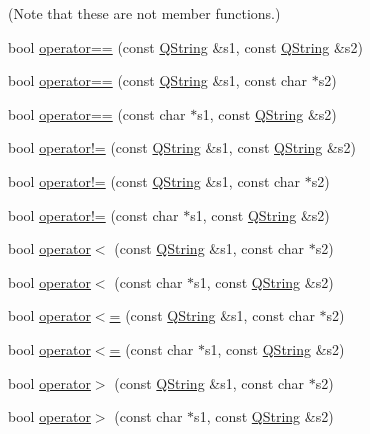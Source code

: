 (Note that these are not member functions.) \begin{DoxyCompactItemize}
\item 
bool \mbox{\hyperlink{class_q_string_acdeb7d77a324fe69b0e5889ff8575400}{operator==}} (const \mbox{\hyperlink{class_q_string}{Q\+String}} \&s1, const \mbox{\hyperlink{class_q_string}{Q\+String}} \&s2)
\item 
bool \mbox{\hyperlink{class_q_string_af35a5ca71a731a8ecf66c62a74123be2}{operator==}} (const \mbox{\hyperlink{class_q_string}{Q\+String}} \&s1, const char $\ast$s2)
\item 
bool \mbox{\hyperlink{class_q_string_af13dfeb5517343bb511393c74f18a3b6}{operator==}} (const char $\ast$s1, const \mbox{\hyperlink{class_q_string}{Q\+String}} \&s2)
\item 
bool \mbox{\hyperlink{class_q_string_aaeae05f02ef07005a07ac285706920dd}{operator!=}} (const \mbox{\hyperlink{class_q_string}{Q\+String}} \&s1, const \mbox{\hyperlink{class_q_string}{Q\+String}} \&s2)
\item 
bool \mbox{\hyperlink{class_q_string_a77e694c60b1699442a3f13e8bbc0c4a9}{operator!=}} (const \mbox{\hyperlink{class_q_string}{Q\+String}} \&s1, const char $\ast$s2)
\item 
bool \mbox{\hyperlink{class_q_string_aba83e5b91872eeb6af5f55d7b96ab50b}{operator!=}} (const char $\ast$s1, const \mbox{\hyperlink{class_q_string}{Q\+String}} \&s2)
\item 
bool \mbox{\hyperlink{class_q_string_abe479c7e9bb723be856c1bcc388fb50f}{operator$<$}} (const \mbox{\hyperlink{class_q_string}{Q\+String}} \&s1, const char $\ast$s2)
\item 
bool \mbox{\hyperlink{class_q_string_ad25d50b4f92864191c30a5a76e7894b8}{operator$<$}} (const char $\ast$s1, const \mbox{\hyperlink{class_q_string}{Q\+String}} \&s2)
\item 
bool \mbox{\hyperlink{class_q_string_a12eb758cb95c371ba27ef75d82c2ec86}{operator$<$=}} (const \mbox{\hyperlink{class_q_string}{Q\+String}} \&s1, const char $\ast$s2)
\item 
bool \mbox{\hyperlink{class_q_string_a98d7107dd1903d01a5fabeab999fe398}{operator$<$=}} (const char $\ast$s1, const \mbox{\hyperlink{class_q_string}{Q\+String}} \&s2)
\item 
bool \mbox{\hyperlink{class_q_string_ab0ce893122b9d85769be403013196aed}{operator$>$}} (const \mbox{\hyperlink{class_q_string}{Q\+String}} \&s1, const char $\ast$s2)
\item 
bool \mbox{\hyperlink{class_q_string_a382b1ef4a8de8768259b825b534fcda1}{operator$>$}} (const char $\ast$s1, const \mbox{\hyperlink{class_q_string}{Q\+String}} \&s2)

\end{DoxyCompactItemize}
